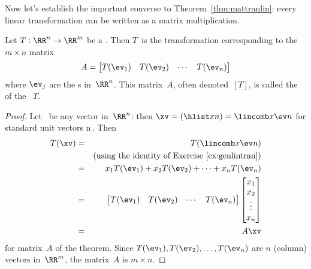 Now let's establish the important converse to Theorem~\ref{thm:mattranlin}: every linear transformation can be written as a matrix multiplication.

\begin{theorem} \label{thm:matlintran} 
Let \(T:\RR^n\to\RR^m\) be a .
Then \(T\)~is the transformation corresponding to the \(m\times n\)  matrix
\begin{equation*}
A=\begin{bmatrix} T(\ev_1)& T(\ev_2)&\cdots&T(\ev_n) \end{bmatrix}
\end{equation*}
where \(\ev_j\) are the s in~\(\RR^n\).
This matrix~\(A\), often denoted~\([T]\), is called the  of the ~\(T\).
\end{theorem}
\begin{proof} 
Let \xv\ be any vector in~\(\RR^n\): then \(\xv=(\hlist xn)=\lincomb x\ev n\) for standard unit vectors \hlist\ev n\,.
Then
\begin{eqnarray*}
T(\xv)&=&T(\lincomb x\ev n)
\\&&(\text{using the identity of Exercise~\ref{ex:genlintran}})
\\&=&x_1T(\ev_1)+x_2T(\ev_2)+\cdots+x_nT(\ev_n)
\\&=&\begin{bmatrix} T(\ev_1)& T(\ev_2)&\cdots&T(\ev_n) \end{bmatrix}
\begin{bmatrix} x_1\\x_2\\\vdots\\x_n \end{bmatrix}
\\&=&A\xv
\end{eqnarray*}
for matrix~\(A\) of the theorem.
Since \(T(\ev_1), T(\ev_2),\ldots,T(\ev_n)\) are \(n\) (column) vectors in~\(\RR^m\), the matrix~\(A\) is \(m\times n\).
\end{proof}


